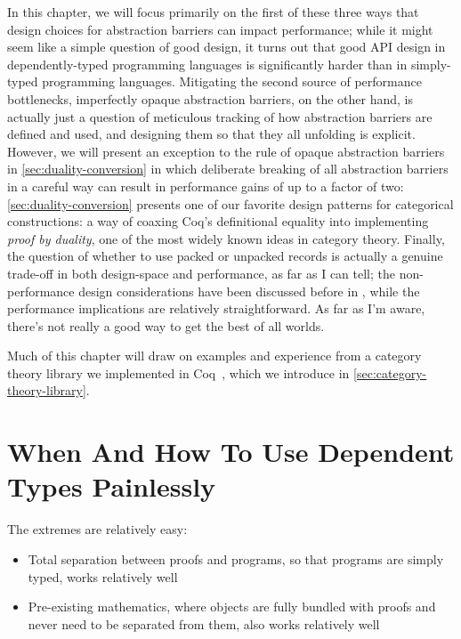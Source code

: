 In this chapter, we will focus primarily on the first of these three ways that design choices for abstraction barriers can impact performance; while it might seem like a simple question of good design, it turns out that good API design in dependently-typed programming languages is significantly harder than in simply-typed programming languages.
Mitigating the second source of performance bottlenecks, imperfectly opaque abstraction barriers, on the other hand, is actually just a question of meticulous tracking of how abstraction barriers are defined and used, and designing them so that they all unfolding is explicit.
However, we will present an exception to the rule of opaque abstraction barriers in \autoref{sec:duality-conversion} in which deliberate breaking of all abstraction barriers in a careful way can result in performance gains of up to a factor of two:
\autoref{sec:duality-conversion} presents one of our favorite design patterns for categorical constructions: a way of coaxing Coq's definitional equality into implementing \emph{proof by duality}, one of the most widely known ideas in category theory.
Finally, the question of whether to use packed or unpacked records is actually a genuine trade-off in both design-space and performance, as far as I can tell;
the non-performance design considerations have been discussed before in \textcite{Packaging2009Garillot}, while the performance implications are relatively straightforward.
As far as I'm aware, there's not really a good way to get the best of all worlds.

Much of this chapter will draw on examples and experience from a category theory library we implemented in Coq~\cite{category-coq-experience}, which we introduce in \autoref{sec:category-theory-library}.

\section{When And How To Use Dependent Types Painlessly}\label{sec:when-how-dependent-types}
The extremes are relatively easy:
\begin{itemize}
\item
  Total separation between proofs and programs, so that programs are simply typed, works relatively well
\item
  Pre-existing mathematics, where objects are fully bundled with proofs and never need to be separated from them, also works relatively well
\end{itemize}

